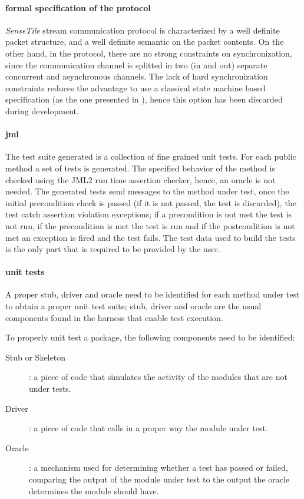\documentclass{article}
\newcommand{\ST}{\emph{SenseTile}\xspace}
\begin{document}
\paragraph{formal specification of the protocol}

\ST stream communication protocol is characterized by a well definite packet structure, and a well definite semantic on the packet contents.  
On the other hand, in the protocol, there are no strong constraints on synchronization, since the communication channel is splitted in two (in and out) separate concurrent and asynchronous channels.
The lack of hard synchronization constraints reduces the advantage to use a classical state machine based specification (as the one presented in \cite{Hubbers2004}), hence this option has been discarded during development.

\paragraph{jml}

The test suite generated is a collection of fine grained unit tests.
For each public method a set of tests is generated.
The specified behavior of the method is checked using the JML2 run time assertion checker, hence, an oracle is not needed.  
The generated tests send messages to the method under test, once the initial precondition check is passed (if it is not passed, the test is discarded), the test catch assertion violation exceptions; if a precondition is not met the test is not run, if the precondition is met the test is run and if the postcondition is not met an exception is fired and the test fails.
The test data used to build the tests is the only part that is required to be provided by the user.

\paragraph{unit tests}

A proper stub, driver and oracle need to be identified for each method under test to obtain a proper unit test suite; stub, driver and oracle are the usual components found in the harness that enable test execution\cite{Binder1999}.  

To properly unit test a package, the following components need to be identified:
\begin{description}
\item[Stub or Skeleton]: a piece of code that simulates the activity of the modules that are not under tests.
\item[Driver]: a piece of code that calls in a proper way the module under test.
\item[Oracle]: a mechanism used for determining whether a test has passed or failed, comparing the output of the module under test to the output the oracle determines the module should have.
\end{description}
\end{document}
